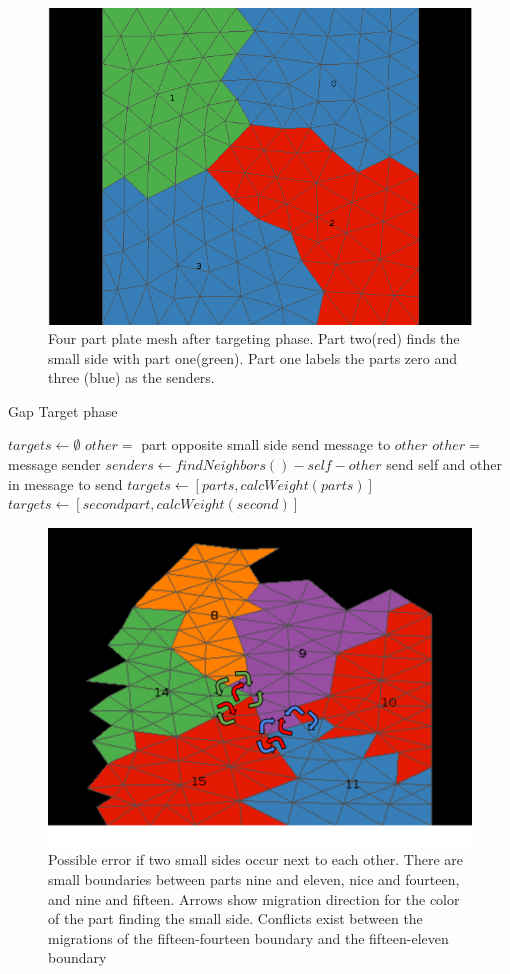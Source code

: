 \documentclass{thesis}
\let\ForEach\ForAll
\begin{document}
\begin{figure} [!h]
\centering
\captionsetup{justification=centering,margin=1cm}
\includegraphics[width=.6\textwidth]{target_example.png}
\caption{\label{fig:boundary} \textnormal{Four part plate mesh after targeting phase. Part two(red) finds the small side with part one(green). Part one labels the parts zero and three (blue) as the senders.}}
\end{figure}

\begin{algorithm}
\caption{Gap Target phase}
\label{alg:targets}
\begin{algorithmic}[1]
  \State $targets \leftarrow \emptyset$
    \State $other = $ part opposite small side
    \State send message to $other$
  \EndIf
    \State $other = $ message sender
    \State $senders \leftarrow findNeighbors() - self - other$
  \EndIf
  \ForEach {$send \in senders$}
    \State send self and other in message to send
  \EndFor
    \State $targets \leftarrow [parts,calcWeight(parts)]$
    \State $targets \leftarrow [secondpart,calcWeight(second)]$
  \EndIf
\EndProcedure
\end{algorithmic}
\end{algorithm}


\begin{figure} [hb]
\centering
\captionsetup{justification=centering,margin=1cm}
\includegraphics[width=.6\textwidth]{MIS_problem.png}
\caption{\label{fig:recvsend} \textnormal{Possible error if two small sides occur next to each other. There are small boundaries between parts nine and eleven, nice and fourteen, and nine and fifteen. Arrows show migration direction for the color of the part finding the small side. Conflicts exist between the migrations of the fifteen-fourteen boundary and the fifteen-eleven boundary}}
\end{figure}
\end{document}
